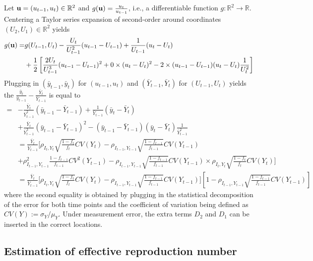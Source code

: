 \documentclass[aoas]{amsart}
\begin{document}
Let ${\bf u} = (u_{t-1},u_t) \in \mathbb{R}^2$ and $g({\bf u}) = \frac{u_t}{u_{t-1}}$, i.e., a differentiable function $g:\mathbb{R}^2 \to \mathbb{R}$. Centering a Taylor series expansion of second-order around coordinates $(U_2, U_1) \in \mathbb{R}^2$ yields
$$
\begin{aligned}
g({\bf u}) =& g(U_{t-1}, U_t) - \frac{U_t}{U_{t-1}^2} (u_{t-1} - U_{t-1}) + \frac{1}{U_{t-1}} (u_t - U_t) \\
&+ \frac{1}{2} \left[ \frac{2 U_t}{U_{t-1}^3} (u_{t-1} - U_{t-1})^2 + 0 \times (u_t - U_t)^2 - 2 \times (u_{t-1} - U_{t-1}) (u_t - U_t) \frac{1}{U_t^2} \right]
\end{aligned}
$$
Plugging in $(\bar y_{t-1}, \bar y_t)$ for $(u_{t-1}, u_t)$ and $(\bar Y_{t-1}, \bar Y_t)$ for $(U_{t-1}, U_t)$ yields the $\frac{\bar y_t}{\bar y_{t-1}} - \frac{\bar Y_t}{\bar Y_{t-1}} $ is equal to
$$
\begin{aligned}
=&
- \frac{\bar Y_t}{\bar Y_{t-1}^2} (\bar y_{t-1} - \bar Y_{t-1}) + \frac{1}{\bar Y_{t-1}} (\bar y_t - \bar Y_t) \\
&+ \frac{\bar Y_t}{\bar Y_{t-1}^3} (\bar y_{t-1} - \bar Y_{t-1})^2 -  (\bar y_{t-1} - \bar Y_{t-1}) (\bar y_t - \bar Y_t) \frac{1}{\bar Y_{t-1}^2} \\
&= \frac{\bar Y_t}{\bar Y_{t-1}} \bigg[  \rho_{I_t,Y_t} \sqrt{\frac{1-f_t}{f_t}} CV (Y_t)  -\rho_{I_{t-1},Y_{t-1}} \sqrt{\frac{1-f_{t-1}}{f_{t-1}}} CV (Y_{t-1}) \\
&+ \rho^2_{I_{t-1},Y_{t-1}} \frac{1-f_{t-1}}{f_{t-1}} CV^2 (Y_{t-1}) -  \rho_{I_{t-1},Y_{t-1}} \sqrt{\frac{1-f_{t-1}}{f_{t-1}}} CV (Y_{t-1}) \times
\rho_{I_t,Y_t} \sqrt{\frac{1-f_t}{f_t}} CV (Y_t)   \bigg] \\
&= \frac{\bar Y_t}{\bar Y_{t-1}} \bigg[ \rho_{I_t,Y_t} \sqrt{\frac{1-f_t}{f_t}} CV (Y_t)  -\rho_{I_{t-1},Y_{t-1}} \sqrt{\frac{1-f_{t-1}}{f_{t-1}}} CV (Y_{t-1}) \bigg] \left[ 1 - \rho_{I_{t-1},Y_{t-1}} \sqrt{\frac{1-f_{t-1}}{f_{t-1}}} CV (Y_{t-1}) \right]
\end{aligned}
$$
where the second equality is obtained by plugging in the statistical decomposition of the error for both time points and the coefficient of variation being defined as $CV(Y) := \sigma_Y/\mu_Y$.  Under measurement error, the extra terms $D_{2}$ and $D_1$ can be inserted in the correct locations.

\subsection{Estimation of effective reproduction number}
\end{document}

